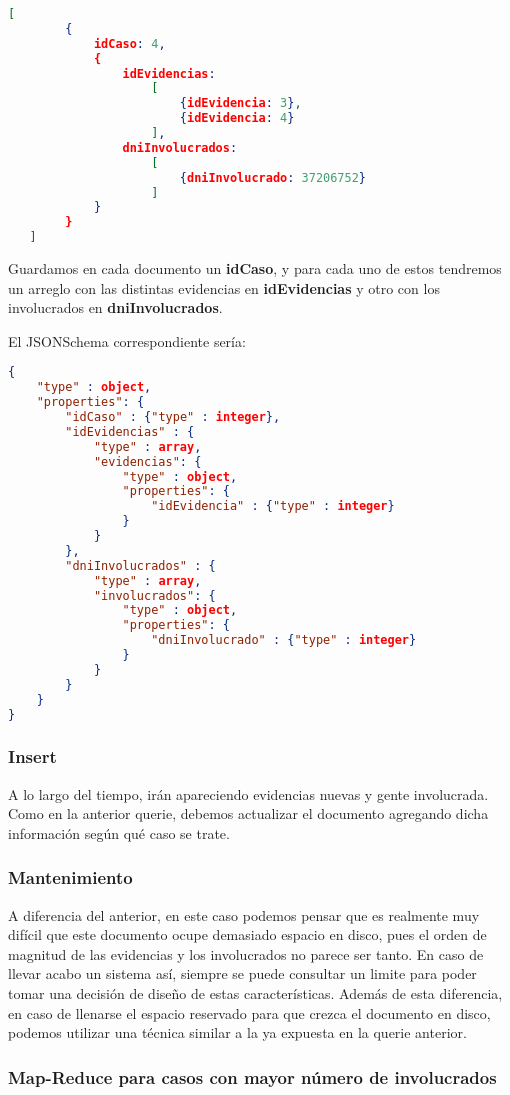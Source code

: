 \documentclass[11pt, a4paper]{article}
\begin{document}
\begin{lstlisting}[language=json]
   [
   		{
   			idCaso: 4,
	   		{
	   			idEvidencias: 
	   				[	
	   					{idEvidencia: 3},
	   					{idEvidencia: 4}
	   				],
	   			dniInvolucrados:
	   				[
	   					{dniInvolucrado: 37206752}
	   				]
	   		}
	   	}
   ]
\end{lstlisting}

Guardamos en cada documento un \textbf{idCaso}, y para cada uno de estos tendremos un arreglo con las distintas evidencias en \textbf{idEvidencias} y otro con los involucrados en \textbf{dniInvolucrados}. \

El JSONSchema correspondiente sería:
\begin{lstlisting}[language=json]
{
	"type" : object,
	"properties": {
		"idCaso" : {"type" : integer},
		"idEvidencias" : {
			"type" : array,
			"evidencias": {
				"type" : object,
				"properties": {
					"idEvidencia" : {"type" : integer}
				}
			}
		},
		"dniInvolucrados" : {
			"type" : array,
			"involucrados": {
				"type" : object,
				"properties": {
					"dniInvolucrado" : {"type" : integer}
				}
			}
		}
	}
}
\end{lstlisting}

\subsubsection{Insert}

A lo largo del tiempo, ir\'an apareciendo evidencias nuevas y gente involucrada. Como en la anterior querie, debemos actualizar el documento agregando dicha informaci\'on seg\'un qué caso se trate.

\subsubsection{Mantenimiento}

A diferencia del anterior, en este caso podemos pensar que es realmente muy difícil que este documento ocupe demasiado espacio en disco, pues el orden de magnitud de las evidencias y los involucrados no parece ser tanto. En caso de llevar acabo un sistema as\'i, siempre se puede consultar un limite para poder tomar una decisi\'on de dise\~no de estas caracter\'isticas. Adem\'as de esta diferencia, en caso de llenarse el espacio reservado para que crezca el documento en disco, podemos utilizar una t\'ecnica similar a la ya expuesta en la querie anterior.

\subsubsection{Map-Reduce para casos con mayor número de involucrados}
\end{document}
